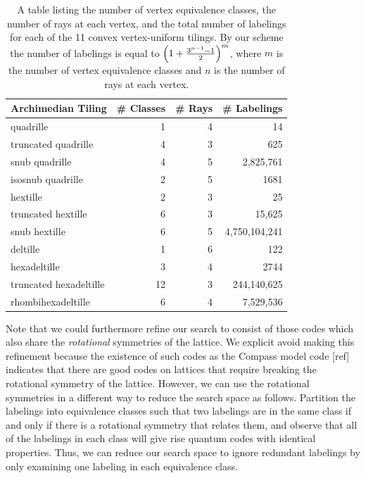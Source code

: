 \documentclass[twocolumn,showpacs,preprintnumbers,amsmath,amssymb,nofootinbib,pra,floatfix]{revtex4-1}
\begin{document}
\begin{table}
\begin{tabular}{lrrr} \toprule
Archimedian Tiling & \# Classes & \# Rays & \# Labelings \\ \midrule
quadrille & 1 & 4 & 14\\
truncated quadrille & 4 & 3 & 625\\
snub quadrille & 4 & 5 & 2,825,761\\
isosnub quadrille & 2 & 5 & 1681\\
hextille & 2 & 3 & 25\\
truncated hextille & 6 & 3 & 15,625\\
snub hextille & 6 & 5 & 4,750,104,241\\
deltille & 1 & 6 & 122\\
hexadeltille & 3 & 4 & 2744\\
truncated hexadeltille & 12 & 3 & 244,140,625\\
rhombihexadeltille & 6 & 4 & 7,529,536\\ \bottomrule
\end{tabular}
\caption{
\label{table:combinatorics}
A table listing the number of vertex equivalence classes, the number of rays at each vertex, and the total number of labelings for each of the 11 convex vertex-uniform tilings.  By our scheme the number of labelings is equal to $\left(1+\frac{3^{n-1}-1}{2}\right)^m$, where $m$ is the number of vertex equivalence classes and $n$ is the number of rays at each vertex.}
\end{table}

Note that we could furthermore refine our search to consist of those codes which also share the \emph{rotational} symmetries of the lattice.  We explicit avoid making this refinement because the existence of such codes as the Compass model code [ref] indicates that there are good codes on lattices that require breaking the rotational symmetry of the lattice.  However, we can use the rotational symmetries in a different way to reduce the search space as follows.  Partition the labelings into equivalence classes such that two labelings are in the same class if and only if there is a rotational symmetry that relates them, and observe that all of the labelings in each class will give rise quantum codes with identical properties.  Thus, we can reduce our search space to ignore redundant labelings by only examining one labeling in each equivalence class.
\end{document}
